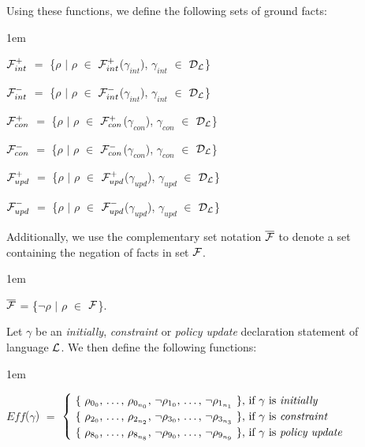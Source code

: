 \documentclass[11pt]{report}
\newenvironment{vquote}
{
  \begin{list}{}{\leftmargin 1em}\item[]
}
{
  \end{list}
}
\begin{document}
      Using these functions, we define the following sets of ground facts:

      \begin{vquote}
        ${\cal F}^{+}_{int}$ $=$
        \{$\rho$ $\mid$ $\rho$ $\in$ ${\cal F}^{+}_{int}$($\gamma_{int}$), $\gamma_{int}$ $\in$ ${\cal D}_{\cal L}$\}

        ${\cal F}^{-}_{int}$ $=$
        \{$\rho$ $\mid$ $\rho$ $\in$ ${\cal F}^{-}_{int}$($\gamma_{int}$), $\gamma_{int}$ $\in$ ${\cal D}_{\cal L}$\}

        ${\cal F}^{+}_{con}$ $=$
        \{$\rho$ $\mid$ $\rho$ $\in$ ${\cal F}^{+}_{con}$($\gamma_{con}$), $\gamma_{con}$ $\in$ ${\cal D}_{\cal L}$\}

        ${\cal F}^{-}_{con}$ $=$
        \{$\rho$ $\mid$ $\rho$ $\in$ ${\cal F}^{-}_{con}$($\gamma_{con}$), $\gamma_{con}$ $\in$ ${\cal D}_{\cal L}$\}

        ${\cal F}^{+}_{upd}$ $=$
        \{$\rho$ $\mid$ $\rho$ $\in$ ${\cal F}^{+}_{upd}$($\gamma_{upd}$), $\gamma_{upd}$ $\in$ ${\cal D}_{\cal L}$\}

        ${\cal F}^{-}_{upd}$ $=$
        \{$\rho$ $\mid$ $\rho$ $\in$ ${\cal F}^{-}_{upd}$($\gamma_{upd}$), $\gamma_{upd}$ $\in$ ${\cal D}_{\cal L}$\}
      \end{vquote}

      Additionally, we use the complementary set notation
      $\overline{{\cal F}}$ to denote a set containing the negation of
      facts in set ${\cal F}$.

      \begin{vquote}
        $\overline{{\cal F}}$ =
        \{$\lnot\rho$ $\mid$ $\rho$ $\in$ ${\cal F}$\}.
      \end{vquote}

      Let $\gamma$ be an {\em initially}, {\em constraint} or
      {\em policy update} declaration statement of language ${\cal L}$. We then
      define the following functions:

      \begin{vquote}
        $Eff$($\gamma$)
        $=$
        \begin{math}
          \begin{cases}
            \mbox{
              \{
                $\rho_{0_0}$, \ldots, $\rho_{0_{n_0}}$,
                $\lnot\rho_{1_0}$, \ldots, $\lnot\rho_{1_{n_1}}$
              \},
              if $\gamma$ is {\em initially}
            } \\
            \mbox{
              \{
                $\rho_{2_0}$, \ldots, $\rho_{2_{n_2}}$,
                $\lnot\rho_{3_0}$, \ldots, $\lnot\rho_{3_{n_3}}$
              \},
              if $\gamma$ is {\em constraint}
            } \\
            \mbox{
              \{
                $\rho_{8_0}$, \ldots, $\rho_{8_{n_8}}$,
                $\lnot\rho_{9_0}$, \ldots, $\lnot\rho_{9_{n_9}}$
              \},
              if $\gamma$ is {\em policy update}
            } \\
          \end{cases}
        \end{math}
      \end{vquote}
\end{document}
